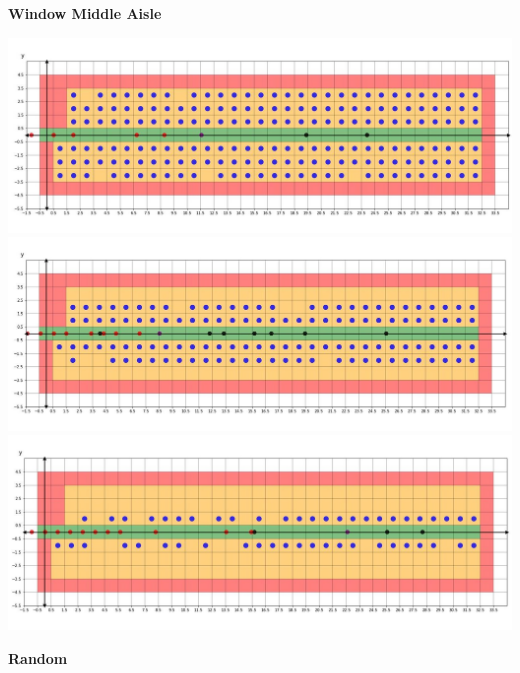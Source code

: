 \documentclass{article}
\begin{document}
	\large \textbf{Window Middle Aisle}
	\begin{center}
		\includegraphics[width=14cm]{wdmd1.jpg}\\
		\includegraphics[width=14cm]{wdmd2.jpg}\\
		\includegraphics[width=14cm]{wdmd3.jpg}\\
	\end{center}
	\large \textbf{Random}
\end{document}
